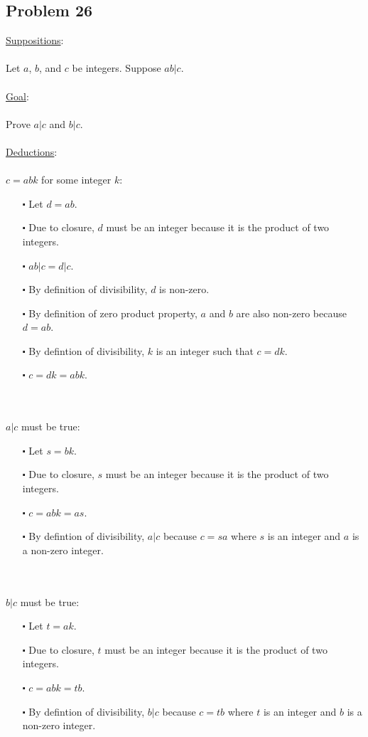 \documentclass[12pt]{article}
\begin{document}
\subsection*{Problem 26}
\underline{Suppositions}:
\\ \\
Let $a$, $b$, and $c$ be integers. Suppose $ab|c$.
\\ \\
\underline{Goal}:
\\ \\
Prove $a|c$ and $b|c$.
\\ \\
\underline{Deductions}:
\\ \\
$c = abk$ for some integer $k$:
\begin{itemize}
  \item [$\centerdot$] Let $d = ab$. 
  \item [$\centerdot$] Due to closure, $d$ must be an integer because it is the product of two integers.
  \item [$\centerdot$] $ab|c = d|c$.
  \item [$\centerdot$] By definition of divisibility, $d$ is non-zero.
  \item [$\centerdot$] By definition of zero product property, $a$ and $b$ are also non-zero because $d=ab$.
  \item [$\centerdot$] By defintion of divisibility, $k$ is an integer such that $c = dk$.
  \item [$\centerdot$] $c = dk = abk$.
\end{itemize}
\newblock
\\ \\
$a|c$ must be true:
\begin{itemize}
  \item [$\centerdot$] Let $s = bk$.
  \item [$\centerdot$] Due to closure, $s$ must be an integer because it is the product of two integers.
  \item [$\centerdot$] $c = abk = as$.
  \item [$\centerdot$] By defintion of divisibility, $a|c$ because $c = sa$ where $s$ is an integer and $a$ is a non-zero integer.
\end{itemize}
\newblock
\\ \\
$b|c$ must be true:
\begin{itemize}
  \item [$\centerdot$] Let $t = ak$.
  \item [$\centerdot$] Due to closure, $t$ must be an integer because it is the product of two integers.
  \item [$\centerdot$] $c = abk = tb$.
  \item [$\centerdot$] By defintion of divisibility, $b|c$ because $c = tb$ where $t$ is an integer and $b$ is a non-zero integer.
\end{itemize}
\end{document}
